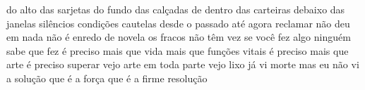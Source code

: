 \begin{poem}
\begin{stanza}
do alto das sarjetas\verseline
do fundo das calçadas\verseline
de dentro das carteiras\verseline
debaixo das janelas\verseline
\qquad silêncios\verseline
\qquad condições\verseline
\qquad cautelas\verseline
desde o passado até agora\verseline
reclamar não deu em nada\verseline
não é enredo de novela\verseline
os fracos não têm vez\verseline
se você fez algo\verseline
ninguém sabe que fez\verseline
é preciso mais que vida\verseline
mais que funções vitais\verseline
é preciso mais que arte\verseline
é preciso superar\verseline
\qquad vejo arte\verseline
\qquad em toda parte\verseline
\qquad vejo lixo\verseline
\qquad já vi morte\verseline
mas eu não vi\verseline
a solução\verseline
\qquad \qquad que é a força\verseline
\qquad \qquad \qquad que é a firme\verseline
\qquad \qquad resolução
\end{stanza}
\end{poem}